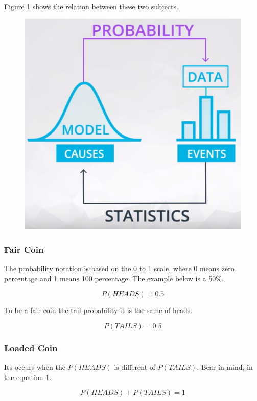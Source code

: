\documentclass[]{book}
\begin{document}
Figure 1 shows the relation between these two subjects.

\begin{figure}
\centering
\includegraphics{01-img/c4_l4_01.png}
\caption{}
\end{figure}

\subsubsection{Fair Coin}\label{fair-coin}

The probability notation is based on the 0 to 1 scale, where 0 means
zero percentage and 1 means 100 percentage. The example below is a 50\%.

\[ P(HEADS) = 0.5 \]

To be a fair coin the tail probability it is the same of heads.

\[ P(TAILS) = 0.5 \]

\subsubsection{Loaded Coin}\label{loaded-coin}

Its occurs when the \(P(HEADS)\) is different of \(P(TAILS)\). Bear in
mind, in the equation 1.

\[ P(HEADS) + P(TAILS) = 1 \tag{1}\]
\end{document}
